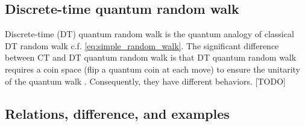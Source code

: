 \subsection{Discrete-time quantum random walk}
Discrete-time (DT) quantum random walk is the quantum analogy of classical DT random walk c.f. \cref{eq:simple_random_walk}.
The significant difference between CT and DT quantum random walk is that DT quantum random walk requires a coin space (flip a quantum coin at each move) to ensure the unitarity of the quantum walk \cite{ambainisOnedimensionalQuantumWalks2001}.
Consequently, they have different behaviors.
[TODO]

\subsection{Relations, difference, and examples}
